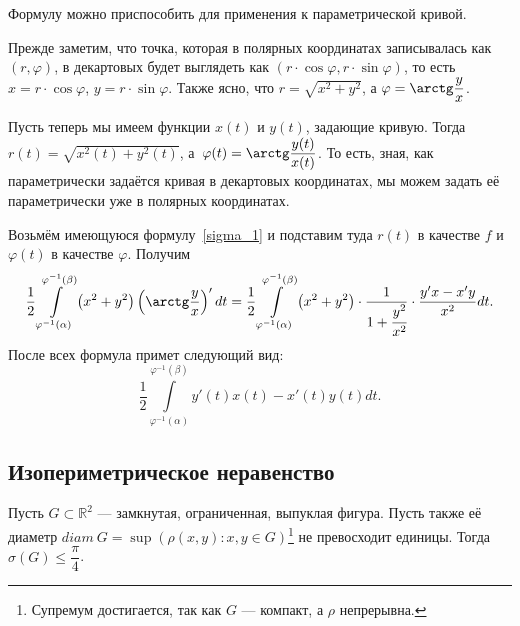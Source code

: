 \begin{remark}
	Формулу можно приспособить для применения к параметрической кривой.
	
	Прежде заметим, что точка, которая в полярных координатах записывалась как \((r, \varphi)\), в декартовых будет выглядеть как \((r \cdot \cos \varphi, r \cdot \sin \varphi)\), то есть \(x = r \cdot \cos \varphi\), \(y = r \cdot \sin \varphi\). Также ясно, что \(r = \sqrt{x^2 + y^2}\), а \(\varphi = \arctg \dfrac{y}{x}\).
	
	Пусть теперь мы имеем функции \(x(t)\) и \(y(t)\), задающие кривую. Тогда \(r(t) = \sqrt{x^2(t) + y^2(t)}\), а~\(\varphi(t) = \arctg \dfrac{y(t)}{x(t)}\). То есть, зная, как параметрически задаётся кривая в декартовых координатах, мы можем задать её параметрически уже в полярных координатах.
	
	Возьмём имеющуюся формулу~\eqref{sigma_1} и подставим туда \(r(t)\) в качестве \(f\) и \(\varphi(t)\) в качестве \(\varphi\).  Получим \[
	\frac{1}{2}\int\limits_{\varphi^{-1}(\alpha)}^{\varphi^{-1}(\beta)} \left(x^2 + y^2 \right) \left(\arctg \frac{y}{x}\right)' dt
	= \frac{1}{2}\int\limits_{\varphi^{-1}(\alpha)}^{\varphi^{-1}(\beta)} \left(x^2 + y^2 \right) \cdot \frac{1}{1 + \cfrac{y^2}{x^2}} \cdot \frac{y'x - x'y}{x^2} dt.
	\]
	После всех формула примет следующий вид: \[
	\frac{1}{2}\int\limits_{\varphi^{-1}(\alpha)}^{\varphi^{-1}(\beta)} y'(t)x(t) - x'(t)y(t) dt.
	\]
\end{remark}

\subsection{\color{red} Изопериметрическое неравенство}

\begin{example}
	Пусть \(G \subset \mathbb{R}^2\) --- замкнутая, ограниченная, выпуклая фигура. Пусть также её диаметр \(diam \ G = \sup \left(\rho(x, y) : x, y \in G \right)\)\footnote{Супремум достигается, так как \(G\) --- компакт, а \(\rho\) непрерывна.} не превосходит единицы. Тогда \(\sigma(G) \leqslant \dfrac{\pi}{4}\).
\end{example}

